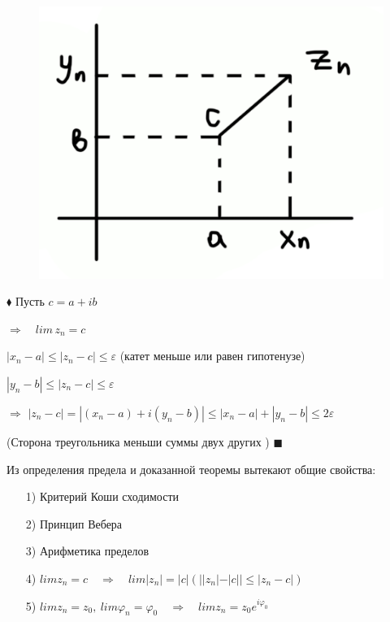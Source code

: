\documentclass[a4paper, 12pt]{report}
\begin{document}
\begin{figure} 
    \vspace{-1ex}
    \includegraphics[width=0.9\linewidth]{kompl/3kompl.png}
\end{figure}

$\blacklozenge$\hspace{2 mm} Пусть $c=a+ib$
 
 $\Rightarrow \quad lim\, z_n=c$ 
 \par\bigskip
 $|x_n-a|\leqslant|z_n-c|\leqslant\varepsilon$ (катет меньше или равен гипотенузе)
 
 $|y_n-b|\leqslant|z_n-c|\leqslant\varepsilon$
 \par\bigskip
  $\Rightarrow$ \quad $|z_n-c|=|(x_n-a)+i(y_n-b)|\leqslant|x_n-a|+|y_n-b|\leqslant2\varepsilon$
  
  (Сторона треугольника меньши суммы двух других ) \quad $\blacksquare$
  \par\bigskip
  Из определения предела и доказанной теоремы вытекают общие свойства:

  \begin{enumerate}
\item[1)] Критерий Коши сходимости
\item[2)] Принцип Вебера
\item[3)] Арифметика пределов
\item[4)] $lim z_n=c \quad \Rightarrow \quad lim|z_n|=|c| (||z_n|-|c||\leqslant|z_n-c|)$
\item[5)] $lim z_n=z_0,\ lim\varphi_n=\varphi_0\quad \Rightarrow \quad limz_n=z_0e^{i\varphi_0}$
\end{enumerate}
\end{document}
